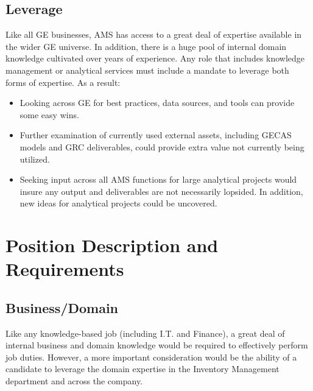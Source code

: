 \documentclass[letterpaper]{article}
\begin{document}
    \subsection{Leverage}

    Like all GE businesses, AMS has access to a great deal of expertise
    available in the wider GE universe.  In addition, there is a huge pool
    of internal domain knowledge cultivated over years of experience.  Any role
    that includes knowledge management or analytical services must include
    a mandate to leverage both forms of expertise.  As a result:

    \begin{itemize}
        \item Looking across GE for best practices, data sources, and tools
        can provide some easy wins.

        \item Further examination of currently used external assets, including
        GECAS models and GRC deliverables, could provide extra value not currently
        being utilized.

        \item Seeking input across all AMS functions for large analytical projects
        would insure any output and deliverables are not necessarily lopsided.
        In addition, new ideas for analytical projects could be uncovered.
    \end{itemize}    


\section{Position Description and Requirements}

    \subsection{Business/Domain}

    Like any knowledge-based job (including I.T. and Finance), a great deal
    of internal business and domain knowledge would be required to effectively
    perform job duties.  However, a more important consideration would be the
    ability of a candidate to leverage the domain expertise in the
    Inventory Management department and across the company.
\end{document}
